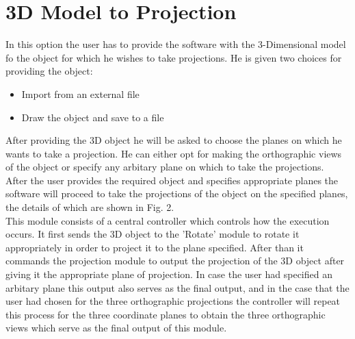 \documentclass[a4paper,12pt,openany]{report}
\begin{document}
\chapter*{3D Model to Projection}
In this option the user has to provide the software with the 3-Dimensional model fo the object for which he wishes to take projections. He is given two choices for providing the object:
\begin{itemize}
  \item Import from an external file
  \item Draw the object and save to a file
\end{itemize}

After providing the 3D object he will be asked to choose the planes on which he wants to take a projection. He can either opt for making the orthographic views of the object or specify any arbitary plane on which to take the projections.\\

After the user provides the required object and specifies appropriate planes the software will proceed to take the projections of the object on the specified planes, the details of which are shown in Fig. 2.\\


This module consists of a central controller which controls how the execution occurs. It first sends the 3D object to the 'Rotate' module to rotate it appropriately in order to project it to the plane specified. After than it commands the projection module to output the projection of the 3D object after giving it the appropriate plane of projection. In case the user had specified an arbitary plane this output also serves as the final output, and in the case that the user had chosen for the three orthographic projections the controller will repeat this process for the three coordinate planes to obtain the three orthographic views which serve as the final output of this module. 
\end{document}
